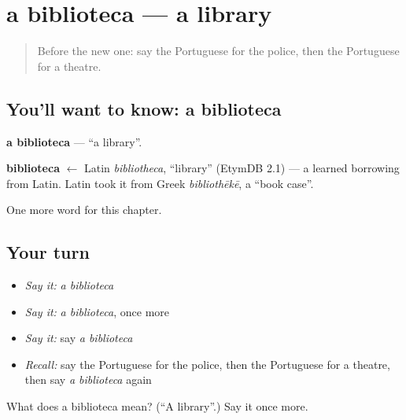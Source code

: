 \section[a biblioteca]{a biblioteca — a library}

\label{lesson:PT-C76-biblioteca}



\begin{quote}
Before the new one: say the Portuguese for the police, then the Portuguese for a theatre.
\end{quote}

\subsection*{You'll want to know: a biblioteca}
\textbf{a biblioteca} — \textquotedblleft{}a library\textquotedblright{}.

\begin{cousinweb}
\textbf{biblioteca} $\leftarrow$ Latin \emph{bibliotheca}, \textquotedblleft{}library\textquotedblright{} (EtymDB 2.1) — a learned borrowing from Latin. Latin took it from Greek \emph{bibliothēkē}, a \textquotedblleft{}book case\textquotedblright{}.
\end{cousinweb}

\begin{grammarlens}[title={What you've built}]
One more word for this chapter.
\end{grammarlens}

\subsection*{Your turn}
\begin{itemize}
\raggedright
  \item \emph{Say it:} \emph{a biblioteca}
  \item \emph{Say it:} \emph{a biblioteca}, once more
  \item \emph{Say it:} say \emph{a biblioteca}
  \item \emph{Recall:} say the Portuguese for the police, then the Portuguese for a theatre, then say \emph{a biblioteca} again
\end{itemize}

\begin{tcolorbox}[breakable,colback=teal!4,colframe=teal!35!black,title={Before you move on}]
What does a biblioteca mean? (\textquotedblleft{}A library\textquotedblright{}.) Say it once more.
\end{tcolorbox}

